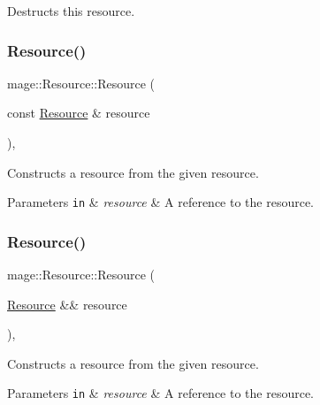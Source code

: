 Destructs this resource. \hypertarget{classmage_1_1_resource_a4ee2dba2675546b603e03a69a2f2db52}{}\label{classmage_1_1_resource_a4ee2dba2675546b603e03a69a2f2db52} 
\subsubsection{\texorpdfstring{Resource()}{Resource()}\hspace{0.1cm}{\footnotesize\ttfamily [2/3]}}
{\footnotesize\ttfamily mage\+::\+Resource\+::\+Resource (\begin{DoxyParamCaption}\item[{const \hyperlink{classmage_1_1_resource}{Resource} \&}]{resource }\end{DoxyParamCaption})\hspace{0.3cm}{\ttfamily [private]}, {\ttfamily [delete]}}

Constructs a resource from the given resource.


\begin{DoxyParams}[1]{Parameters}
\mbox{\tt in}  & {\em resource} & A reference to the resource. \\
\hline
\end{DoxyParams}
\hypertarget{classmage_1_1_resource_af524c27c4a8e949af7c1145c56b773d0}{}\label{classmage_1_1_resource_af524c27c4a8e949af7c1145c56b773d0} 
\subsubsection{\texorpdfstring{Resource()}{Resource()}\hspace{0.1cm}{\footnotesize\ttfamily [3/3]}}
{\footnotesize\ttfamily mage\+::\+Resource\+::\+Resource (\begin{DoxyParamCaption}\item[{\hyperlink{classmage_1_1_resource}{Resource} \&\&}]{resource }\end{DoxyParamCaption})\hspace{0.3cm}{\ttfamily [private]}, {\ttfamily [delete]}}

Constructs a resource from the given resource.


\begin{DoxyParams}[1]{Parameters}
\mbox{\tt in}  & {\em resource} & A reference to the resource. \\
\hline
\end{DoxyParams}


